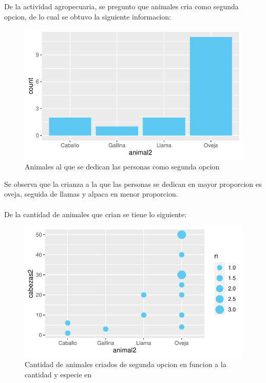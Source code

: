 \documentclass[12pt]{article}\usepackage[]{graphicx}\usepackage[]{xcolor}
\makeatletter
\def\maxwidth{ %
  \ifdim\Gin@nat@width>\linewidth
    \linewidth
  \else
    \Gin@nat@width
  \fi
}
\newenvironment{knitrout}{}{} %
\makeatother
\begin{document}
	
	De la actividad agropecuaria, se pregunto que animales cria como segunda opcion, de lo cual se obtuvo la siguiente informacion:
	\begin{figure}[H]
	\centering
\begin{knitrout}
\color{fgcolor}
\includegraphics[width=\maxwidth]{figure/eighteen-1} 
\end{knitrout}
	\caption{Animales al que se dedican las personas como segunda opcion}
	\end{figure}
	Se observa que la crianza a la que las personas se dedican en mayor proporcion es oveja, seguida de llamas y alpaca en menor proporcion.\\
	\\
	De la cantidad de animales que crian se tiene lo siguiente:
	\begin{figure}[H]
	\centering
\begin{knitrout}
\color{fgcolor}
\includegraphics[width=\maxwidth]{figure/nineteen-1} 
\end{knitrout}
	\caption{Cantidad de animales criados de segunda opcion en funcion a la cantidad y especie en \comunidad}
	\end{figure}
	
\end{document}

